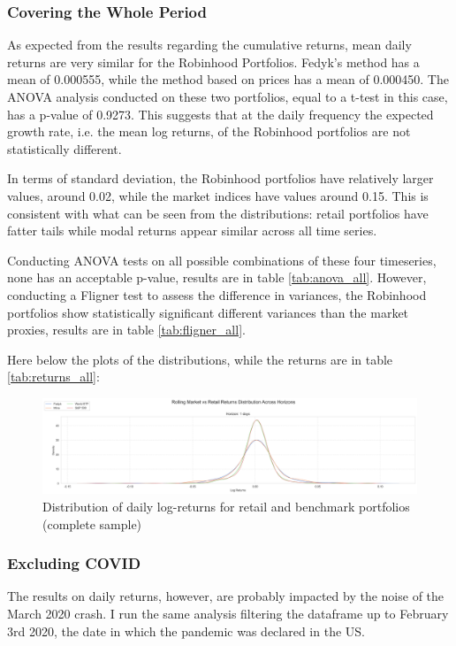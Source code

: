 \subsubsection{Covering the Whole Period}
As expected from the results regarding the cumulative returns, mean daily returns are very similar for the Robinhood Portfolios.
Fedyk's method has a mean of 0.000555, while the method based on prices has a mean of 0.000450.
The ANOVA analysis conducted on these two portfolios, equal to a t-test in this case, has a p-value of 0.9273.
This suggests that at the daily frequency the expected growth rate, i.e. the mean log returns, of the Robinhood portfolios are not statistically different.


In terms of standard deviation, the Robinhood portfolios have relatively larger values, around 0.02, while the market indices have values around 0.15. 
This is consistent with what can be seen from the distributions: retail portfolios have fatter tails while modal returns appear similar across all time series.

Conducting ANOVA tests on all possible combinations of these four timeseries, none has an acceptable p-value, results are in table \ref{tab:anova_all}.
However, conducting a Fligner test to assess the difference in variances, the Robinhood portfolios show statistically significant different variances than the market proxies, results are in table \ref{tab:fligner_all}.


Here below the plots of the distributions, while the returns are in table \ref{tab:returns_all}:
\begin{figure}[H]
    \centering
    \includegraphics[width=1\linewidth]
    {../images/distributions/st_all.png}
    \caption{Distribution of daily log-returns for retail and benchmark portfolios (complete sample)}
\end{figure}


\subsubsection{Excluding COVID}
The results on daily returns, however, are probably impacted by the noise of the March 2020 crash. 
I run the same analysis filtering the dataframe up to February 3rd 2020, the date in which the pandemic was declared in the US.

